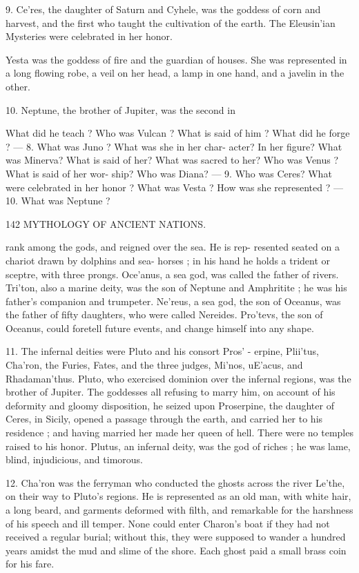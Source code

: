 \documentclass[openany,a4paper]{memoir}
\begin{document}
9. Ce'res, the daughter of Saturn and Cyhele, was the 
goddess of corn and harvest, and the first who taught the 
cultivation of the earth. The Eleusin'ian Mysteries were 
celebrated in her honor. 

Yesta was the goddess of fire and the guardian of houses. 
She was represented in a long flowing robe, a veil on her 
head, a lamp in one hand, and a javelin in the other. 

10. Neptune, the brother of Jupiter, was the second in 

What did he teach ? Who was Vulcan ? What is said of him ? 
What did he forge ? — 8. What was Juno ? What was she in her char- 
acter? In her figure? What was Minerva? What is said of her? 
What was sacred to her? Who was Venus ? What is said of her wor- 
ship? Who was Diana? — 9. Who was Ceres? What were celebrated 
in her honor ? What was Vesta ? How was she represented ? — 10. What 
was Neptune ? 



142 MYTHOLOGY OF ANCIENT NATIONS. 

rank among the gods, and reigned over the sea. He is rep- 
resented seated on a chariot drawn by dolphins and sea- 
horses ; in his hand he holds a trident or sceptre, with three 
prongs. Oce'anus, a sea god, was called the father of rivers. 
Tri'ton, also a marine deity, was the son of Neptune and 
Amphritite ; he was his father's companion and trumpeter. 
Ne'reus, a sea god, the son of Oceanus, was the father of 
fifty daughters, who were called Nereides. Pro'tevs, the 
son of Oceanus, could foretell future events, and change 
himself into any shape. 

11. The infernal deities were Pluto and his consort Pros' - 
erpine, Plii'tus, Cha'ron, the Furies, Fates, and the three 
judges, Mi'nos, uE'acus, and Rhadaman'thus. Pluto, who 
exercised dominion over the infernal regions, was the brother 
of Jupiter. The goddesses all refusing to marry him, on 
account of his deformity and gloomy disposition, he seized 
upon Proserpine, the daughter of Ceres, in Sicily, opened a 
passage through the earth, and carried her to his residence ; 
and having married her made her queen of hell. There were 
no temples raised to his honor. Plutus, an infernal deity, 
was the god of riches ; he was lame, blind, injudicious, and 
timorous. 

12. Cha'ron was the ferryman who conducted the ghosts 
across the river Le'the, on their way to Pluto's regions. He 
is represented as an old man, with white hair, a long beard, 
and garments deformed with filth, and remarkable for the 
harshness of his speech and ill temper. None could enter 
Charon's boat if they had not received a regular burial; 
without this, they were supposed to wander a hundred years 
amidst the mud and slime of the shore. Each ghost paid a 
small brass coin for his fare. 
\end{document}
